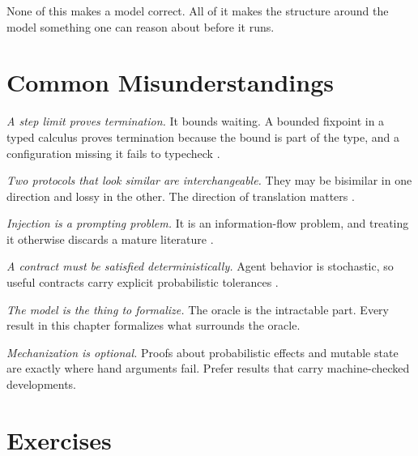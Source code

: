 \documentclass[11pt]{book}
\begin{document}
None of this makes a model correct. All of it makes the structure around the model something one can reason about before it runs.

\section{Common Misunderstandings}

\textit{A step limit proves termination.} It bounds waiting. A bounded fixpoint in a typed calculus proves termination because the bound is part of the type, and a configuration missing it fails to typecheck \cite{lambdaA2026}.

\textit{Two protocols that look similar are interchangeable.} They may be bisimilar in one direction and lossy in the other. The direction of translation matters \cite{toolcalculus2026}.

\textit{Injection is a prompting problem.} It is an information-flow problem, and treating it otherwise discards a mature literature \cite{llmbda2026}.

\textit{A contract must be satisfied deterministically.} Agent behavior is stochastic, so useful contracts carry explicit probabilistic tolerances \cite{agentcontracts2026}.

\textit{The model is the thing to formalize.} The oracle is the intractable part. Every result in this chapter formalizes what surrounds the oracle.

\textit{Mechanization is optional.} Proofs about probabilistic effects and mutable state are exactly where hand arguments fail. Prefer results that carry machine-checked developments.

\section*{Exercises}
\end{document}

